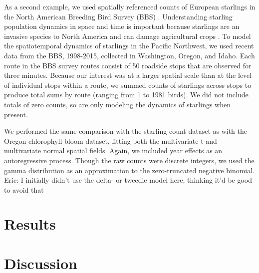 \documentclass[12pt,english]{article}
\begin{document}
As a second example, we used spatially referenced counts of European starlings
in the North American Breeding Bird Survey (BBS) \citep{pardieck2016}.
Understanding starling population dynamics in space and time is important
because starlings are an invasive species to North America and can damage
agricultural crops \citep{linz2007}. To model the spatiotemporal dynamics of
starlings in the Pacific Northwest, we used recent data from the BBS,
1998-2015, collected in Washington, Oregon, and Idaho. Each route in the BBS
survey routes consist of 50 roadside stops that are observed for three minutes.
Because our interest was at a larger spatial scale than at the level of
individual stops within a route, we summed counts of starlings across stops to
produce total sums by route (ranging from 1 to 1981 birds). We did not include
totals of zero counts, so are only modeling the dynamics of starlings when
present.

We performed the same comparison with the starling count dataset as with the
Oregon chlorophyll bloom dataset, fitting both the multivariate-t and
multivariate normal spatial fields. Again, we included year effects as an
autoregressive process. Though the raw counts were discrete integers, we used
the gamma distribution as an approximation to the zero-truncated negative
binomial. Eric: I initially didn't use the delta- or tweedie model here,
thinking it'd be good to avoid that

\section{Results}

\section{Discussion}


\end{document}
